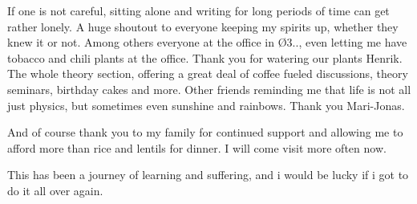 \documentclass[UKenglish]{uiomasterthesis}
\begin{document}
If one is not careful, sitting alone and writing for long periods of time can get rather lonely. A huge shoutout to everyone keeping my spirits up, whether they knew it or not. Among others everyone at the office in Ø3.., even letting me have tobacco and chili plants at the office. Thank you for watering our plants Henrik. The whole theory section, offering a great deal of coffee fueled discussions, theory seminars, birthday cakes and more. Other friends reminding me that life is not all just physics, but sometimes even sunshine and rainbows. Thank you Mari-Jonas. 

And of course thank you to my family for continued support and allowing me to afford more than rice and lentils for dinner. I will come visit more often now.

This has been a journey of learning and suffering, and i would be lucky if i got to do it all over again.

\tableofcontents












\printbibliography

\appendix

\end{document}
